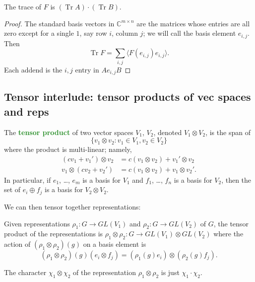 \documentclass[10pt]{scrartcl}
\providecommand{\CC}{\mathbb C}
\providecommand{\opname}{\operatorname}
\providecommand{\vocab}[1]{{\textbf{\textcolor{ForestGreen}{#1}}}}
\begin{document}
\begin{prop}
	The trace of $F$ is $(\opname{Tr}A)\cdot (\opname{Tr}B)$.
\end{prop}

\begin{proof}
	The standard basis vectors in $\CC^{m\times n}$ are the matrices
	whose entries are all zero except for a single $1$, say
	row $i$, column $j$; we will call the basis element $e_{i,j}$. Then
	\[\opname{Tr}F = \sum_{i,j}\langle F(e_{i,j}) e_{i,j}\rangle.\]
	Each addend is the $i,j$ entry in $Ae_{i,j}B$
\end{proof}


\subsection{Tensor interlude: tensor products of vec spaces and reps}
\begin{definition}
	The \vocab{tensor product} of two vector spaces $V_1$, $V_2$,
	denoted $V_1\otimes V_2$, is the span of
	\[\{v_1\otimes v_2 : v_1\in V_1,v_2\in V_2\}\]
	where the product is multi-linear; namely,
	\begin{align*}
		(cv_1 + v_1')\otimes v_2 &= c(v_1\otimes v_2) + v_1'\otimes v_2\\
		v_1\otimes (cv_2 + v_2') &= c(v_1\otimes v_2) + v_1\otimes v_2'.
	\end{align*}
	In particular, if $e_1$, \dots, $e_m$ is a basis for $V_1$
	and $f_1$, \dots, $f_n$ is a basis for $V_2$, then the set of
	$e_i\oplus f_j$ is a basis for $V_2\otimes V_2$.
\end{definition}

We can then tensor together representations:
\begin{definition}
	Given representations $\rho_1\colon G\to GL(V_1)$
	and $\rho_2\colon G\to GL(V_2)$ of $G$, the tensor product of
	the representations is $\rho_1\otimes \rho_2\colon G\to GL(V_1)
	\otimes GL(V_2)$ where the action of $(\rho_1\otimes\rho_2)(g)$
	on a basis element is
	\[(\rho_1\otimes\rho_2)(g) (e_i\otimes f_j) =
	(\rho_1(g)e_i)\otimes(\rho_2(g)f_j).\]
\end{definition}

\begin{prop}
	The character $\chi_1\otimes\chi_2$ of the representation
	$\rho_1\otimes\rho_2$ is just $\chi_1\cdot\chi_2$.
\end{prop}
\end{document}
